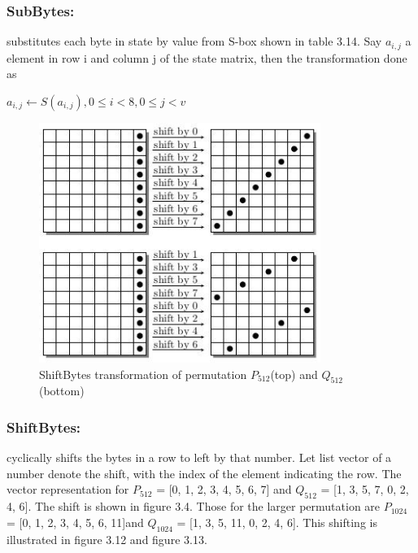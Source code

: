   \subsubsection{SubBytes:} substitutes each byte in state by value from S-box shown in table 3.14.
  Say $a_{i,j}$ a element in row i and column j of the state matrix, then the transformation done as 
  \begin{center}$a_{i,j} \gets S( a_{i,j}),  0 \leq i < 8, 0 \leq j < v$ \end{center}
  
  \begin{figure}
    \begin{center}
      \includegraphics[width=3.6in]{groestl512shift.jpg}
    \end{center}
    \caption{ShiftBytes transformation of permutation $P_{512}$(top) and $Q_{512}$(bottom) \cite{00019}}
    \label{fig:lab}
  \end{figure}

  \subsubsection{ShiftBytes:} cyclically shifts the bytes in a row to left by that number. Let list 
  vector of a number denote the shift, with the index of the element indicating the row. The vector representation
  for $P_{512}$ = [0, 1, 2, 3, 4, 5, 6, 7] and $Q_{512}$ = [1, 3, 5, 7, 0, 2, 4, 6]. The shift is shown in figure
  3.4. Those for the larger permutation are $P_{1024}$ = [0, 1, 2, 3, 4, 5, 6, 11]and $Q_{1024}$ = 
  [1, 3, 5, 11, 0, 2, 4, 6]. This shifting is illustrated in figure 3.12 and figure 3.13.
    
